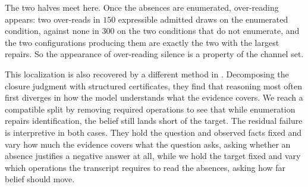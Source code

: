 \documentclass{article}
\theoremstyle{plain}
\theoremstyle{definition}
\theoremstyle{remark}
\begin{document}
The two halves meet here. Once the absences are enumerated, over-reading appears:
two over-reads in $150$ expressible admitted
draws on the enumerated condition, against none in $300$ on the two conditions
that do not enumerate, and the two configurations producing them are exactly the
two with the largest repairs. So the appearance of over-reading silence is a
property of the channel set.

This localization is also recovered by a different method in \citet{crownqa2026}.
Decomposing the closure judgment with structured certificates, they find that
reasoning most often first diverges in how the model understands what
the evidence covers. 
We reach a compatible split by removing required operations to see that while
enumeration repairs identification, the belief still lands short of the target. 
The residual failure is interpretive in both cases. 
They hold the question and observed facts fixed and vary how much the
evidence covers what the question asks, asking whether an absence justifies a
negative answer at all, while we hold
the target fixed and vary which operations the transcript requires to read the absences, asking how
far belief should move.
\end{document}
